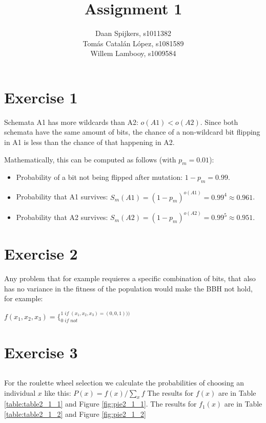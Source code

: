 \documentclass{scrartcl}
\title{Assignment 1}
\author{Daan Spijkers, s1011382\\ Tomás Catalán López, s1081589\\ Willem Lambooy, s1009584}
\begin{document}
\maketitle

\begin{abstract}

\end{abstract}

\section{Exercise 1}
Schemata A1 has more wildcards than A2: $o(A1) < o(A2)$. Since both schemata have the same amount of bits, the chance of a non-wildcard bit flipping in A1 is less than the chance of that happening in A2.

Mathematically, this can be computed as follows (with $p_m=0.01$):
\begin{itemize}
 \item Probability of a bit not being flipped after mutation: $1-p_m=0.99$.
 \item Probability that A1 survives: $S_m(A1)=(1-p_m)^{o(A1)}=0.99^4\approx0.961$.
 \item Probability that A2 survives: $S_m(A2)=(1-p_m)^{o(A2)}=0.99^5\approx0.951$.
\end{itemize}

\section{Exercise 2}
Any problem that for example requieres a specific combination of bits, that also has no variance in the fitness of the population would make the BBH not hold, for example:\\
\begin{center}
$\displaystyle f(x_1,x_2,x_3)=\mathrm{ \{ }
_{0 \; if \; not}
^{1\;if \; (x_1,x_2,x_3)=(0,0,1)))}$
\end{center}

\section{Exercise 3}
\subsection{}
For the roulette wheel selection we calculate the probabilities of choosing an individual $x$ like this: $P(x) = f(x)/\sum_{x}f$
\newline
The results for $f(x)$ are in Table \ref{table:table2_1_1} and Figure \ref{fig:pie2_1_1}. The results for $f_1(x)$ are in Table \ref{table:table2_1_2} and Figure \ref{fig:pie2_1_2} 
\end{document}
